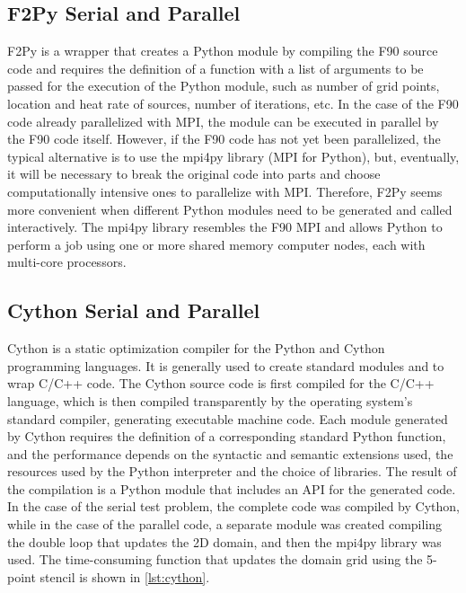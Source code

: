 \documentclass[12pt]{article}
\begin{document}
\subsection{F2Py Serial and Parallel}

F2Py is a wrapper that creates a Python module by compiling the F90 source code and requires the definition of a function with a list of arguments to be passed for the execution of the Python module, such as number of grid points, location and heat rate of sources, number of iterations, etc. In the case of the F90 code already parallelized with MPI, the module can be executed in parallel by the F90 code itself. However, if the F90 code has not yet been parallelized, the typical alternative is to use the mpi4py library (MPI for Python), but, eventually, it will be necessary to break the original code into parts and choose computationally intensive ones to parallelize with MPI. Therefore, F2Py seems more convenient when different Python modules need to be generated and called interactively. The mpi4py library resembles the F90 MPI and allows Python to perform a job using one or more shared memory computer nodes, each with multi-core processors.




\subsection{Cython Serial and Parallel}

Cython is a static optimization compiler for the Python and Cython programming languages. It is generally used to create standard modules and to wrap C/C++ code. The Cython source code is first compiled for the C/C++ language, which is then compiled transparently by the operating system's standard compiler, generating executable machine code. Each module generated by Cython requires the definition of a corresponding standard Python function, and the performance depends on the syntactic and semantic extensions used, the resources used by the Python interpreter and the choice of libraries. The result of the compilation is a Python module that includes an API for the generated code. In the case of the serial test problem, the complete code was compiled by Cython, while in the case of the parallel code, a separate module was created compiling the double loop that updates the 2D domain, and then the mpi4py library was used. The time-consuming function that updates the domain grid using the 5-point stencil is shown in \autoref{lst:cython}.
\end{document}
